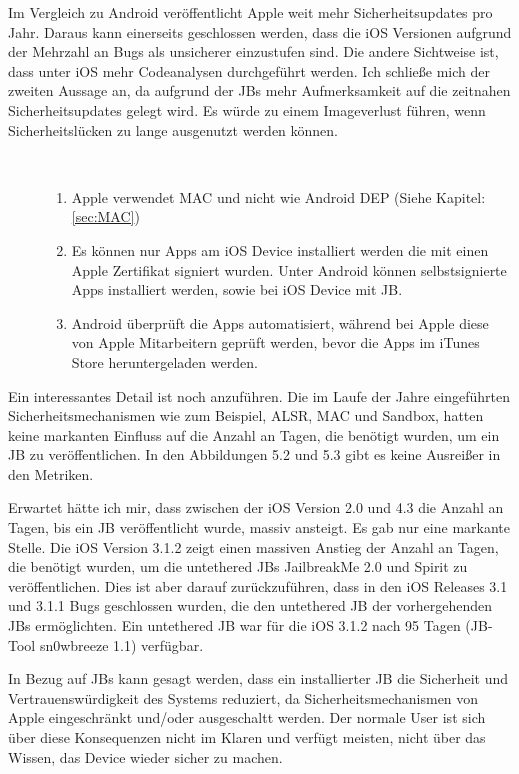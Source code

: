 Im Vergleich zu Android veröffentlicht Apple weit mehr Sicherheitsupdates pro Jahr. Daraus kann einerseits geschlossen werden, dass die iOS Versionen aufgrund der Mehrzahl an Bugs als unsicherer einzustufen sind. Die andere Sichtweise ist, dass unter iOS mehr Codeanalysen durchgeführt werden. Ich schließe mich der zweiten Aussage an, da aufgrund der JBs mehr Aufmerksamkeit auf die zeitnahen Sicherheitsupdates gelegt wird. Es würde zu einem Imageverlust führen, wenn Sicherheitslücken zu lange ausgenutzt werden können. \par
\begin{description}
    \item[\parbox{\textwidth} {Auch in Bezug auf die Sicherheitsmechanismen hat Apple weitere Vorteile gegenüber Android}]~\par
    \begin{enumerate}
        \item Apple verwendet MAC und nicht wie Android DEP (Siehe Kapitel: \ref{sec:MAC})
        \item Es können nur Apps am iOS Device installiert werden die mit einen Apple Zertifikat signiert wurden. Unter Android können selbstsignierte Apps installiert werden, sowie bei iOS Device mit JB.
        \item Android überprüft die Apps automatisiert, während bei Apple diese von Apple Mitarbeitern geprüft werden, bevor die Apps im iTunes Store heruntergeladen werden.  
    \end{enumerate}
\end{description} 

Ein interessantes Detail ist noch anzuführen. Die im Laufe der Jahre eingeführten Sicherheitsmechanismen wie zum Beispiel, ALSR, MAC und Sandbox, hatten keine markanten Einfluss auf die Anzahl an Tagen, die benötigt wurden, um ein JB zu veröffentlichen. In den Abbildungen 5.2 und 5.3 gibt es keine Ausreißer in den Metriken.\par  
Erwartet hätte ich mir, dass zwischen der iOS Version 2.0 und 4.3 die Anzahl an Tagen, bis ein JB veröffentlicht wurde, massiv ansteigt.  Es gab nur eine markante Stelle. Die iOS Version 3.1.2 zeigt einen massiven Anstieg der Anzahl an Tagen, die benötigt wurden, um die untethered JBs JailbreakMe 2.0 und Spirit zu veröffentlichen. Dies ist aber darauf zurückzuführen, dass in den iOS Releases 3.1 und 3.1.1 Bugs geschlossen wurden,  die den untethered JB der vorhergehenden JBs ermöglichten. Ein untethered JB war für die iOS 3.1.2 nach 95 Tagen (JB-Tool sn0wbreeze 1.1) verfügbar.\par
 
In Bezug auf JBs kann gesagt werden, dass ein installierter JB die Sicherheit und Vertrauenswürdigkeit des Systems reduziert, da Sicherheitsmechanismen von Apple eingeschränkt und/oder ausgeschaltt werden. Der normale User ist sich über diese Konsequenzen nicht im Klaren und verfügt meisten, nicht über das Wissen, das Device wieder sicher zu machen.
